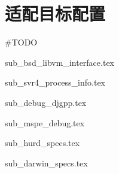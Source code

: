 \section{适配目标配置}

\#TODO

{sub_bsd_libvm_interface.tex}

{sub_svr4_process_info.tex}

{sub_debug_djgpp.tex}

{sub_mspe_debug.tex}

{sub_hurd_specs.tex}

{sub_darwin_specs.tex}
